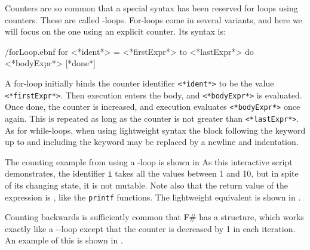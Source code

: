 \documentclass[springer.tex]{subfiles}
\begin{document}
Counters are so common that a special syntax has been reserved for loops using counters. These are called -loops. For-loops come in several variants, and here we will focus on the one using an explicit counter. Its syntax is:
%
\begin{verbatimwrite}{\ebnf/forLoop.ebnf}
for <*ident*> = <*firstExpr*> to <*lastExpr*> do <*bodyExpr*> [*done*]
\end{verbatimwrite}
%
A for-loop initially binds the counter identifier \lstinline[language=syntax]{<*ident*>} to be the value \lstinline[language=syntax]{<*firstExpr*>}. Then execution enters the body, and \lstinline[language=syntax]{<*bodyExpr*>} is evaluated. Once done, the counter is increased, and execution evaluates \lstinline[language=syntax]{<*bodyExpr*>}  once again. This is repeated as long as the counter is not greater than \lstinline[language=syntax]{<*lastExpr*>}. As for while-loops, when using lightweight syntax the block following the  keyword up to and including the  keyword may be replaced by a newline and indentation.

The counting example from  using a -loop is shown in 
%
%
As this interactive script demonstrates, the identifier \lstinline!i! takes all the values between 1 and 10, but in spite of its changing state, it is not mutable. Note also that the return value of the  expression is \lexeme{()}, like the \lstinline!printf! functions. The lightweight equivalent is shown in .
%
%

Counting backwards is sufficiently common that F\# has a  structure, which works exactly like a --loop except that the counter is decreased by 1 in each iteration. An example of this is shown in .
%
%
\end{document}
